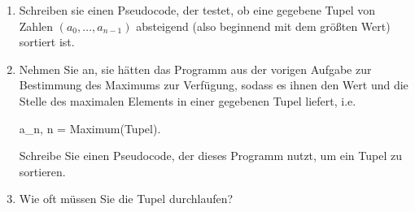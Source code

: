 \begin{enumerate}
	\item Schreiben sie einen Pseudocode, der testet, ob eine gegebene Tupel von Zahlen $(a_0, \dots, a_{n-1})$ absteigend (also beginnend mit dem größten Wert) sortiert ist.
	\item Nehmen Sie an, sie hätten das Programm aus der vorigen Aufgabe zur Bestimmung des Maximums zur Verfügung, sodass es ihnen den Wert und die Stelle
	des maximalen Elements in einer gegebenen Tupel liefert, i.e.
	
	\begin{verb}
		a_n, n = Maximum(Tupel).
	\end{verb}

	Schreibe Sie einen Pseudocode, der dieses Programm nutzt, um ein Tupel zu sortieren.
	
	\item Wie oft müssen Sie die Tupel durchlaufen?
\end{enumerate}
